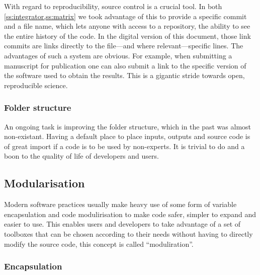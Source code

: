 With regard to reproducibility, source control is a crucial tool. In both \cref{ss:integrator,ss:matrix} we took advantage of this to provide a specific commit and a file name, which lets anyone with access to a repository, the ability to see the entire history of the code. In the digital version of this document, those link commits are links directly to the file---and where relevant---specific lines. The advantages of such a system are obvious. For example, when submitting a manuscript for publication one can also submit a link to the specific version of the software used to obtain the results. This is a gigantic stride towards open, reproducible science.

\subsubsection{Folder structure}

An ongoing task is improving the folder structure, which in the past was almost non-existant. Having a default place to place inputs, outputs and source code is of great import if a code is to be used by non-experts. It is trivial to do and a boon to the quality of life of developers and users.

\subsection{Modularisation}

Modern software practices usually make heavy use of some form of variable encapsulation and code modulirisation to make code safer, simpler to expand and easier to use. This enables users and developers to take advantage of a set of toolboxes that can be chosen according to their needs without having to directly modify the source code, this concept is called ``moduliration''.

\subsubsection{Encapsulation}\label{ss:encapsulation}

